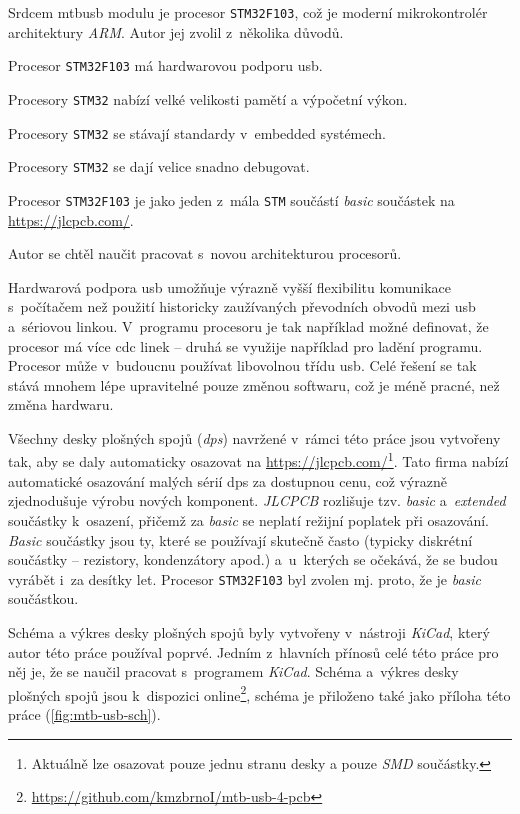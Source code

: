 Srdcem \gls{mtbusb} modulu je procesor \texttt{STM32F103}, což je moderní
mikrokontrolér architektury \textit{ARM}. Autor jej zvolil z~několika důvodů.

\begin{compactenum}
\item Procesor \texttt{STM32F103} má hardwarovou podporu \gls{usb}.
\item Procesory \texttt{STM32} nabízí velké velikosti pamětí a výpočetní výkon.
\item Procesory \texttt{STM32} se stávají standardy v~embedded systémech.
\item Procesory \texttt{STM32} se dají velice snadno debugovat.
\item Procesor \texttt{STM32F103} je jako jeden z~mála \texttt{STM} součástí
	\textit{basic} součástek na \url{https://jlcpcb.com/}.
\item Autor se chtěl naučit pracovat s~novou architekturou procesorů.
\end{compactenum}

Hardwarová podpora \gls{usb} umožňuje výrazně vyšší flexibilitu komunikace
s~počítačem než použití historicky zaužívaných převodních obvodů mezi
\gls{usb} a~sériovou linkou. V~programu procesoru je tak například
možné definovat, že procesor má více \gls{cdc} linek – druhá se využije například
pro ladění programu. Procesor může v~budoucnu používat libovolnou třídu
\gls{usb}. Celé řešení se tak stává mnohem lépe upravitelné pouze změnou
softwaru, což je méně pracné, než změna hardwaru.

Všechny desky plošných spojů (\textit{\gls{dps}}) navržené v~rámci této práce
jsou vytvořeny tak, aby se daly automaticky osazovat na
\url{https://jlcpcb.com/}\footnote{Aktuálně lze osazovat pouze jednu stranu
desky a pouze \textit{SMD} součástky.}. Tato firma nabízí automatické osazování
malých sérií \gls{dps} za dostupnou cenu, což výrazně zjednodušuje výrobu nových
komponent. \textit{JLCPCB} rozlišuje tzv. \textit{basic} a~\textit{extended}
součástky k~osazení, přičemž za \textit{basic} se neplatí režijní poplatek při
osazování. \textit{Basic} součástky jsou ty, které se používají skutečně často
(typicky diskrétní součástky – rezistory, kondenzátory apod.) a~u~kterých se
očekává, že se budou vyrábět i~za desítky let. Procesor \texttt{STM32F103} byl
zvolen mj. proto, že je \textit{basic} součástkou.

Schéma a výkres desky plošných spojů byly vytvořeny v~nástroji \textit{KiCad},
který autor této práce používal poprvé. Jedním z~hlavních přínosů celé této
práce pro něj je, že se naučil pracovat s~programem \textit{KiCad}. Schéma
a~výkres desky plošných spojů jsou k~dispozici
online\footnote{\url{https://github.com/kmzbrnoI/mtb-usb-4-pcb}}, schéma je
přiloženo také jako příloha této práce (\ref{fig:mtb-usb-sch}).

